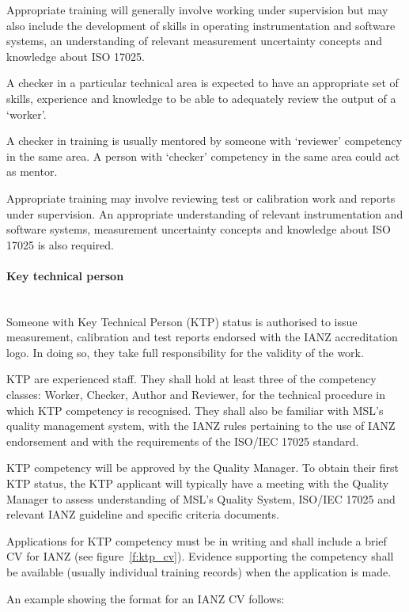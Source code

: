 Appropriate training will generally involve working under supervision but may also include the development of skills in operating instrumentation and software systems, an understanding of relevant measurement uncertainty concepts and knowledge about ISO 17025.
 
A checker in a particular technical area is expected to have an appropriate set of skills, experience and knowledge to be able to adequately review the output of a ‘worker'.

A checker in training is usually mentored by someone with ‘reviewer' competency in the same area. A person with ‘checker' competency in the same area could act as mentor.

Appropriate training may involve reviewing test or calibration work and reports under supervision. An appropriate understanding of relevant instrumentation and software systems, measurement uncertainty concepts and knowledge about ISO 17025 is also required.

\paragraph{Key technical person} \mbox{}\\
Someone with Key Technical Person (KTP) status is authorised to issue measurement, calibration and test reports endorsed with the IANZ accreditation logo. In doing so, they take full responsibility for the validity of the work.

KTP are experienced staff. They shall hold at least three of the competency classes: Worker, Checker, Author and Reviewer, for the technical procedure in which KTP competency is recognised. They shall also be familiar with MSL’s quality management system, with the IANZ rules pertaining to the use of IANZ endorsement and with the requirements of the ISO/IEC 17025 standard.  

KTP competency will be approved by the Quality Manager.  To obtain their first KTP status, the KTP applicant will typically have a meeting with the Quality Manager to assess understanding of MSL's Quality System, ISO/IEC 17025 and relevant IANZ guideline and specific criteria documents.

Applications for KTP competency must be in writing and shall include a brief CV for IANZ (see figure~\ref{f:ktp_cv}). Evidence supporting the competency shall be available (usually individual training records) when the application is made.

An example showing the format for an IANZ CV follows:

